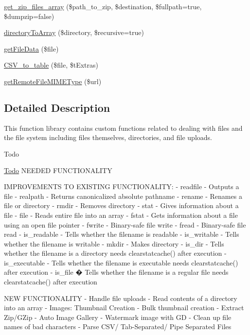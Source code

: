 \begin{DoxyCompactItemize}
\item 
\hyperlink{class_files_a0e50a400e9fd53290dc4c0123974198a}{get\-\_\-zip\-\_\-files\-\_\-array} (\$path\-\_\-to\-\_\-zip, \$destination, \$fullpath=true, \$dumpzip=false)
\item 
\hyperlink{class_files_a712e3adfc98fb9a916d736b215ba3cb8}{directory\-To\-Array} (\$directory, \$recursive=true)
\item 
\hyperlink{class_files_a8f1046c32417d89d113cbd1d880ae42e}{get\-File\-Data} (\$file)
\item 
\hyperlink{class_files_aa91629fe26118aca9c700514bea78869}{C\-S\-V\-\_\-to\-\_\-table} (\$file, \$t\-Extras)
\item 
\hyperlink{class_files_aaa533c6267b5bd113bd34679dc52bef4}{get\-Remote\-File\-M\-I\-M\-E\-Type} (\$url)
\end{DoxyCompactItemize}


\subsection{Detailed Description}
This function library contains custom functions related to dealing with files and the file system including files themselves, directories, and file uploads.

\begin{DoxyRefDesc}{Todo}
\item[\hyperlink{todo__todo000002}{Todo}]N\-E\-E\-D\-E\-D F\-U\-N\-C\-T\-I\-O\-N\-A\-L\-I\-T\-Y\end{DoxyRefDesc}
\begin{DoxyVerb}   IMPROVEMENTS TO EXISTING FUNCTIONALITY:
   - readfile - Outputs a file
   - realpath - Returns canonicalized absolute pathname
   - rename - Renames a file or directory
   - rmdir - Removes directory
   - stat - Gives information about a file
   - file - Reads entire file into an array
   - fstat - Gets information about a file using an open file pointer
   - fwrite - Binary-safe file write
   - fread - Binary-safe file read
   - is_readable - Tells whether the filename is readable
   - is_writable - Tells whether the filename is writable
   - mkdir - Makes directory
   - is_dir - Tells whether the filename is a directory
               needs clearstatcache() after execution
   - is_executable - Tells whether the filename is executable
               needs clearstatcache() after execution
   - is_file � Tells whether the filename is a regular file
               needs clearstatcache() after execution

   NEW FUNCTIONALITY
   - Handle file uploads
   - Read contents of a directory into an array
   - Images: Thumbnail Creation
   - Bulk thumbnail creation
   - Extract Zip/GZip
   - Auto Image Gallery
   - Watermark image with GD
   - Clean up file names of bad characters
   - Parse CSV/ Tab-Separated/ Pipe Separated Files\end{DoxyVerb}
 

